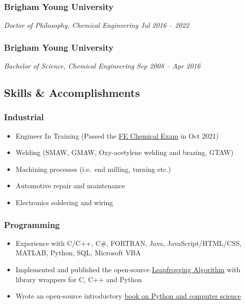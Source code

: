 \hypertarget{brigham-young-university}{%
\subsubsection{Brigham Young
University}\label{brigham-young-university}}

\emph{Doctor of Philosophy, Chemical Engineering \textbar{} Jul 2016 --
2022}

\hypertarget{brigham-young-university-1}{%
\subsubsection{Brigham Young
University}\label{brigham-young-university-1}}

\emph{Bachelor of Science, Chemical Engineering \textbar{} Sep 2008 --
Apr 2016}

\hypertarget{skills-accomplishments}{%
\subsection{Skills \& Accomplishments}\label{skills-accomplishments}}

\hypertarget{industrial}{%
\subsubsection{Industrial}\label{industrial}}

\begin{itemize}
\tightlist
\item
  Engineer In Training (Passed the
  \href{https://account.ncees.org/rn/2233456-1459800-66313c5}{FE
  Chemical Exam} in Oct 2021)
\item
  Welding (SMAW, GMAW, Oxy-acetylene welding and brazing, GTAW)
\item
  Machining processes (i.e.~end milling, turning etc.)
\item
  Automotive repair and maintenance
\item
  Electronics soldering and wiring
\end{itemize}

\hypertarget{programming}{%
\subsubsection{Programming}\label{programming}}

\begin{itemize}
\tightlist
\item
  Experience with C/C++, C\#, FORTRAN, Java, JavaScript/HTML/CSS,
  MATLAB, Python, SQL, Microsoft VBA
\item
  Implemented and published the open-source
  \href{https://github.com/flythereddflagg/lpfgopt}{Leapfrogging
  Algorithm} with library wrappers for C, C++ and Python
\item
  Wrote an open-source introductory
  \href{https://flythereddflagg.github.io/python_book/site/index.html}{book
  on Python and computer science}
\end{itemize}

